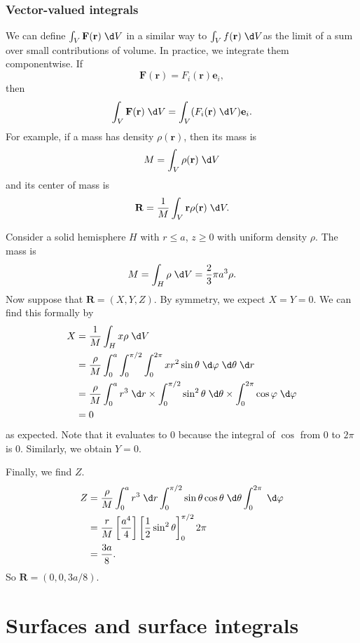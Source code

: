 \documentclass[a4paper]{article}
\begin{document}
\subsubsection*{Vector-valued integrals}
We can define $\int_V \mathbf{F}(\mathbf{r})\;\d V$ in a similar way to $\int_V f(\mathbf{r})\;\d V$as the limit of a sum over small contributions of volume. In practice, we integrate them componentwise. If
\[
  \mathbf{F}(\mathbf{r}) = F_{i}(\mathbf{r})\mathbf{e}_i,
\]
then
\[
  \int_V \mathbf{F}(\mathbf{r})\;\d V = \int_V (F_i(\mathbf{r})\;\d V)\mathbf{e}_i.
\]
For example, if a mass has density $\rho (\mathbf{r})$, then its mass is
\[
  M = \int_V \rho(\mathbf{r})\;\d V
\]
and its center of mass is
\[
  \mathbf{R} = \frac{1}{M}\int_V \mathbf{r}\rho (\mathbf{r})\;\d V.
\]
\begin{eg}
  Consider a solid hemisphere $H$ with $r \leq a$, $z \geq 0$ with uniform density $\rho$. The mass is
  \[
    M = \int_H \rho \;\d V = \frac{2}{3}\pi a^3\rho.
  \]
  Now suppose that $\mathbf{R} = (X, Y, Z)$. By symmetry, we expect $X = Y = 0$. We can find this formally by
  \begin{align*}
    X &= \frac{1}{M}\int_H x\rho \;\d V\\
    &= \frac{\rho}{M}\int_0^a \int_0^{\pi/2}\int_0^{2\pi}xr^2 \sin \theta\;\d \varphi\;\d \theta\;\d r\\
    &= \frac{\rho}{M}\int_0^{a}r^3\;\d r\times \int_0^{\pi/2}\sin^2\theta\;\d \theta\times \int_0^{2\pi}\cos\varphi\;\d \varphi\\
    &= 0
  \end{align*}
  as expected. Note that it evaluates to 0 because the integral of $\cos$ from $0$ to $2\pi$ is 0. Similarly, we obtain $Y = 0$.

  Finally, we find $Z$.
  \begin{align*}
    Z &= \frac{\rho}{M}\int_0^a r^3\;\d r \int_0^{\pi/2}\sin\theta\cos\theta\;\d \theta \int_0^{2\pi}\;\d \varphi\\
    &= \frac{r}{M}\left[\frac{a^4}{4}\right]\left[\frac{1}{2}\sin^2\theta\right]_0^{\pi/2}2\pi\\
    &= \frac{3a}{8}.
  \end{align*}
  So $\mathbf{R} = (0, 0, 3a/8)$.
\end{eg}

\section{Surfaces and surface integrals}
\end{document}
